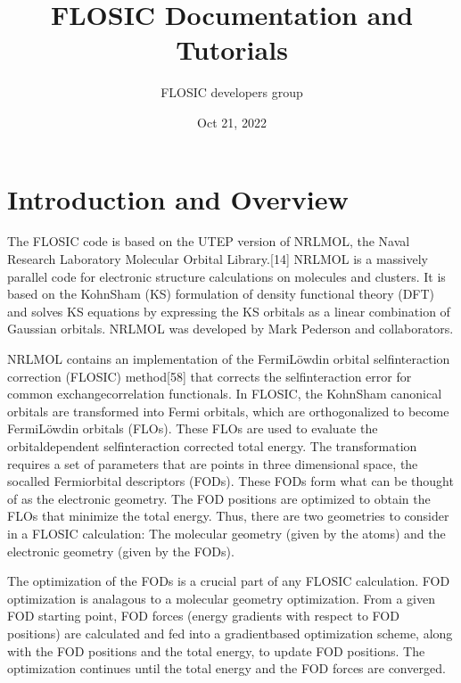 \documentclass[letterpaper,10pt,english,openany,oneside]{sphinxmanual}
\title{FLOSIC Documentation and Tutorials }
\date{Oct 21, 2022}
\author{  FLOSIC developers group }
\begin{document}
\pagestyle{empty}
\sphinxmaketitle
\pagestyle{plain}
\sphinxtableofcontents
\pagestyle{normal}
\label{\detokenize{nrlmoldoc_main::doc}}



\chapter{Introduction and Overview}
\label{\detokenize{index:introduction-and-overview}}\label{\detokenize{index:formatting-text}}\label{\detokenize{index::doc}}
\sphinxAtStartPar
The FLOSIC code is based on the UTEP version of NRLMOL, the Naval Research
Laboratory Molecular Orbital Library.{[}1\sphinxhyphen{}4{]}
NRLMOL is a massively parallel code for electronic structure calculations on molecules and clusters.
It is based on the Kohn\sphinxhyphen{}Sham (KS) formulation of density functional theory (DFT) and solves KS equations by expressing
the KS orbitals as a linear combination of Gaussian orbitals. NRLMOL was developed by Mark Pederson and collaborators.

\sphinxAtStartPar
NRLMOL contains an implementation of the Fermi\sphinxhyphen{}Löwdin orbital self\sphinxhyphen{}interaction correction (FLO\sphinxhyphen{}SIC) method{[}5\sphinxhyphen{}8{]}
that corrects the self\sphinxhyphen{}interaction error for common exchange\sphinxhyphen{}correlation functionals.
In FLO\sphinxhyphen{}SIC, the Kohn\sphinxhyphen{}Sham canonical orbitals are transformed into Fermi orbitals, which are orthogonalized to become Fermi\sphinxhyphen{}Löwdin orbitals (FLOs).
These FLOs are used to evaluate the orbital\sphinxhyphen{}dependent self\sphinxhyphen{}interaction corrected total energy. The transformation requires
a set of parameters that are points in three dimensional space, the so\sphinxhyphen{}called
Fermi\sphinxhyphen{}orbital descriptors (FODs). These FODs form what can be thought of as the electronic geometry.
The FOD positions are optimized to obtain the FLOs that minimize the total energy.
Thus, there are two geometries to consider in a FLOSIC calculation: The molecular geometry (given by the atoms) and the electronic geometry (given by the FODs).

\sphinxAtStartPar
The optimization of the FODs is a crucial part of any FLO\sphinxhyphen{}SIC calculation.
FOD optimization is analagous to a molecular geometry optimization. From a given FOD starting point,
FOD forces (energy gradients with respect to FOD positions)
are calculated and fed into a gradient\sphinxhyphen{}based optimization scheme,
along with the FOD positions and the total energy, to update FOD positions.
The optimization continues until the total energy and the FOD forces are converged.
\end{document}
